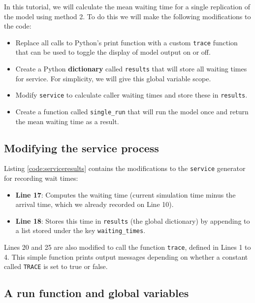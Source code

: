 \documentclass{swpaperproc}
\theoremstyle{sw}
\begin{document}
In this tutorial, we will calculate the mean waiting time for a single replication of the model using method 2. To do this we will make the following modifications to the code:

\begin{itemize}
    \item Replace all calls to Python's print function with a custom \verb|trace| function that can be used to toggle the display of model output on or off.
    \item Create a Python \textbf{dictionary} called \verb|results| that will store all waiting times for service. For simplicity, we will give this global variable scope.
    \item Modify \verb|service| to calculate caller waiting times and store these in \verb|results|.
    \item Create a function called \verb|single_run| that will run the model once and return the mean waiting time as a result.
\end{itemize}



\subsection{Modifying the service process}

Listing \ref{code:serviceresults} contains the modifications to the \verb|service| generator for recording wait times:

\begin{itemize}
    \item \textbf{Line 17}: Computes the waiting time (current simulation time minus the arrival time, which we already recorded on Line 10).
    \item \textbf{Line 18}: Stores this time in \verb|results| (the global dictionary) by appending to a list stored under the key \verb|waiting_times|.
\end{itemize}

Lines 20 and 25 are also modified to call the function \verb|trace|, defined in Lines 1 to 4.  This simple function prints output messages depending on whether a constant called \verb|TRACE| is set to true or false.



\subsection{A run function and global variables}
\end{document}
